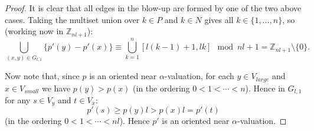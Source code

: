 \documentclass[10pt,a4paper]{amsart}
\begin{document}
\begin{proof}
It is clear that all edges in the blow-up are formed by one of the two above cases. Taking the multiset union over $k \in P$ and $k \in N$ gives all $k \in \{1, \ldots ,n \}$, so (working now in $\mathbb{Z}_{nl+1}$):
\[\bigcup_{(x,y) \in G_{l,1}} \{p'(y)-p'(x)\} \equiv \bigcup_{k=1}^n[l(k-1)+1,lk] \mod nl+1 = \mathbb{Z}_{nl+1} \setminus \{0\}.\]

Now note that, since $p$ is an oriented near $\alpha$-valuation, for each $ y \in V_{large}$ and $x \in V_{small}$ we have $p(y) > p(x)$ (in the ordering $0<1< \cdots < n$). Hence in $G_{l,1}$ for any $s \in V_y$ and $t \in V_x$:
    \[p'(s) \geq p(y)l >   p(x)l = p'(t)\]
(in the ordering $0<1< \cdots< nl$).
Hence $p'$ is an oriented near $\alpha$-valuation.

\end{proof}
\end{document}
